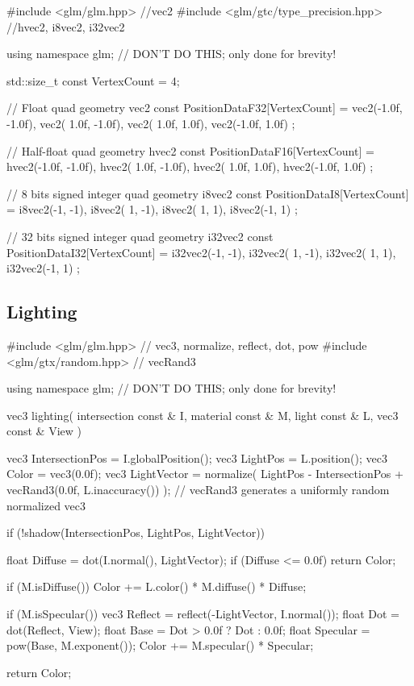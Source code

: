 \documentclass{scrartcl}
\numberwithin{figure}{subsection}
\begin{document}
\begin{cppcode}
#include <glm/glm.hpp> //vec2
#include <glm/gtc/type_precision.hpp> //hvec2, i8vec2, i32vec2

using namespace glm; // DON'T DO THIS; only done for brevity!

std::size_t const VertexCount = 4;

// Float quad geometry
vec2 const PositionDataF32[VertexCount] = {
  vec2(-1.0f, -1.0f),
  vec2( 1.0f, -1.0f),
  vec2( 1.0f,  1.0f),
  vec2(-1.0f,  1.0f)
};

// Half-float quad geometry
hvec2 const PositionDataF16[VertexCount] = {
  hvec2(-1.0f, -1.0f),
  hvec2( 1.0f, -1.0f),
  hvec2( 1.0f,  1.0f),
  hvec2(-1.0f,  1.0f)
};

// 8 bits signed integer quad geometry
i8vec2 const PositionDataI8[VertexCount] = {
  i8vec2(-1, -1),
  i8vec2( 1, -1),
  i8vec2( 1,  1),
  i8vec2(-1,  1)
};

// 32 bits signed integer quad geometry
i32vec2 const PositionDataI32[VertexCount] = {
  i32vec2(-1, -1),
  i32vec2( 1, -1),
  i32vec2( 1,  1),
  i32vec2(-1,  1)
};
\end{cppcode}

\subsection{Lighting}

\begin{cppcode}
#include <glm/glm.hpp> // vec3, normalize, reflect, dot, pow
#include <glm/gtx/random.hpp> // vecRand3

using namespace glm; // DON'T DO THIS; only done for brevity!

vec3 lighting(
  intersection const & I,
  material const & M,
  light const & L,
  vec3 const & View
)
{
  vec3 IntersectionPos = I.globalPosition();
  vec3 LightPos = L.position();
  vec3 Color = vec3(0.0f);
  vec3 LightVector = normalize(
    LightPos - IntersectionPos + vecRand3(0.0f, L.inaccuracy())
  );
  // vecRand3 generates a uniformly random normalized vec3

  if (!shadow(IntersectionPos, LightPos, LightVector)) {
    float Diffuse = dot(I.normal(), LightVector);
    if (Diffuse <= 0.0f)
      return Color;

    if (M.isDiffuse())
      Color += L.color() * M.diffuse() * Diffuse;

    if (M.isSpecular()) {
      vec3 Reflect = reflect(-LightVector, I.normal());
      float Dot = dot(Reflect, View);
      float Base = Dot > 0.0f ? Dot : 0.0f;
      float Specular = pow(Base, M.exponent());
      Color += M.specular() * Specular;
    }
  }

  return Color;
}
\end{cppcode}
\end{document}
